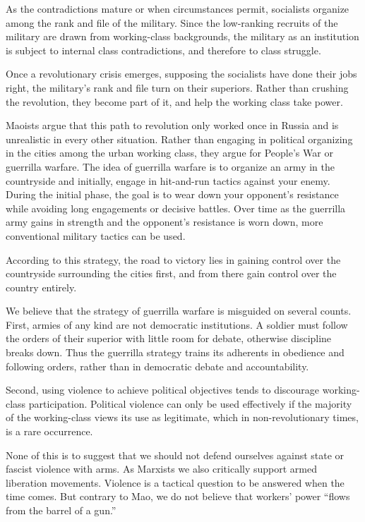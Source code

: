 As the contradictions mature or when circumstances permit, socialists organize among the rank and file of the military. Since the low-ranking recruits of the military are drawn from working-class backgrounds, the military as an institution is subject to internal class contradictions, and therefore to class struggle.

Once a revolutionary crisis emerges, supposing the socialists have done their jobs right, the military's rank and file turn on their superiors. Rather than crushing the revolution, they become part of it, and help the working class take power.

Maoists argue that this path to revolution only worked once in Russia and is unrealistic in every other situation. Rather than engaging in political organizing in the cities among the urban working class, they argue for People's War or guerrilla warfare. The idea of guerrilla warfare is to organize an army in the countryside and initially, engage in hit-and-run tactics against your enemy. During the initial phase, the goal is to wear down your opponent's resistance while avoiding long engagements or decisive battles. Over time as the guerrilla army gains in strength and the opponent's resistance is worn down, more conventional military tactics can be used.

According to this strategy, the road to victory lies in gaining control over the countryside surrounding the cities first, and from there gain control over the country entirely.

We believe that the strategy of guerrilla warfare is misguided on several counts. First, armies of any kind are not democratic institutions. A soldier must follow the orders of their superior with little room for debate, otherwise discipline breaks down. Thus the guerrilla strategy trains its adherents in obedience and following orders, rather than in democratic debate and accountability.

Second, using violence to achieve political objectives tends to discourage working-class participation. Political violence can only be used effectively if the majority of the working-class views its use as legitimate, which in non-revolutionary times, is a rare occurrence.

None of this is to suggest that we should not defend ourselves against state or fascist violence with arms. As Marxists we also critically support armed liberation movements. Violence is a tactical question to be answered when the time comes. But contrary to Mao, we do not believe that workers' power ``flows from the barrel of a gun.''

